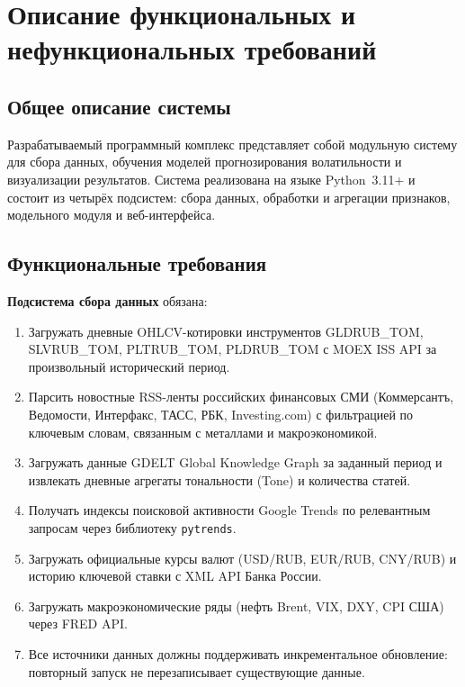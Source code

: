 \section{Описание функциональных и нефункциональных требований}
\label{sec:requirements}

\subsection{Общее описание системы}

Разрабатываемый программный комплекс представляет собой модульную систему
для сбора данных, обучения моделей прогнозирования волатильности
и визуализации результатов.
Система реализована на языке Python~3.11+ и состоит из четырёх подсистем:
сбора данных, обработки и агрегации признаков, модельного модуля и веб-интерфейса.

\subsection{Функциональные требования}

\textbf{Подсистема сбора данных} обязана:
\begin{enumerate}
    \item Загружать дневные OHLCV-котировки инструментов GLDRUB\_TOM, SLVRUB\_TOM,
          PLTRUB\_TOM, PLDRUB\_TOM с MOEX ISS API за произвольный исторический период.
    \item Парсить новостные RSS-ленты российских финансовых СМИ
          (Коммерсантъ, Ведомости, Интерфакс, ТАСС, РБК, Investing.com)
          с фильтрацией по ключевым словам, связанным с металлами и макроэкономикой.
    \item Загружать данные GDELT Global Knowledge Graph за заданный период
          и извлекать дневные агрегаты тональности (Tone) и количества статей.
    \item Получать индексы поисковой активности Google Trends
          по релевантным запросам через библиотеку \texttt{pytrends}.
    \item Загружать официальные курсы валют (USD/RUB, EUR/RUB, CNY/RUB)
          и историю ключевой ставки с XML API Банка России.
    \item Загружать макроэкономические ряды (нефть Brent, VIX, DXY, CPI США)
          через FRED API.
    \item Все источники данных должны поддерживать инкрементальное обновление:
          повторный запуск не перезаписывает существующие данные.
\end{enumerate}

